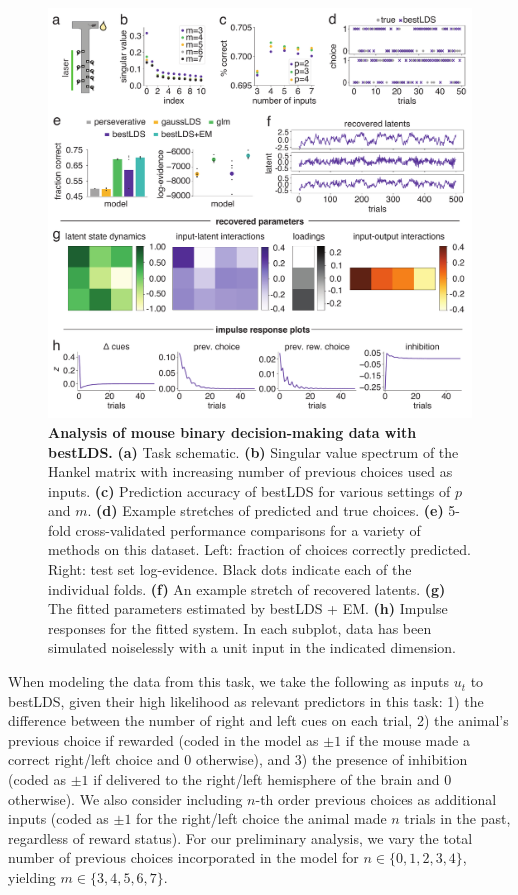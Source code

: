 \begin{figure}[t!]
\centering
\includegraphics[width=0.90\linewidth]{ch4-bestlds/bestlds-figures/fig4.pdf}
\caption[Analysis of mouse binary decision-making data with bestLDS]{\textbf{Analysis of mouse binary decision-making data with bestLDS.} \textbf{(a)} Task schematic. \textbf{(b)} Singular value spectrum of the Hankel matrix with increasing number of previous choices used as inputs. \textbf{(c)} Prediction accuracy of bestLDS for various settings of $p$ and $m$. \textbf{(d)} Example stretches of predicted and true choices. \textbf{(e)} 5-fold cross-validated performance comparisons for a variety of methods on this dataset. Left: fraction of choices correctly predicted. Right: test set log-evidence. Black dots indicate each of the individual folds. \textbf{(f)} An example stretch of recovered latents. \textbf{(g)} The fitted parameters estimated by bestLDS + EM. \textbf{(h)} Impulse responses for the fitted system. In each subplot, data has been simulated noiselessly with a unit input in the indicated dimension.}
\label{fig:bestlds:4}
\end{figure}

When modeling the data from this task, we take the following as inputs $u_t$ to bestLDS, given their high likelihood as relevant predictors in this task: 1) the difference between the number of right and left cues on each trial, 2) the animal's previous choice if rewarded (coded in the model as $\pm 1$ if the mouse made a correct right/left choice and 0 otherwise), and 3) the presence of inhibition (coded as $\pm 1$ if delivered to the right/left hemisphere of the brain and $0$ otherwise). We also consider including $n$-th order previous choices as additional inputs (coded as  $\pm 1$ for the right/left choice the animal made $n$ trials in the past, regardless of reward status). For our preliminary analysis, we vary the total number of previous choices incorporated in the model for $n \in \{0,1,2,3,4\}$, yielding $m \in \{3, 4, 5, 6, 7\}$. 

